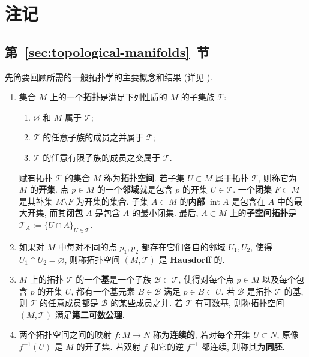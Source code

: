 \section{注记}\label{sec:notes-differentiable-manifolds}

\subsection[第 \ref{sec:topological-manifolds} 节]{第~\ref{sec:topological-manifolds}~节}\label{subsec:notes-topological-manifolds}

先简要回顾所需的一般拓扑学的主要概念和结果 (详见 ).

\begin{enumerate}[label=(\arabic*),leftmargin=*]
\item 集合 $M$ 上的一个\textbf{拓扑}是满足下列性质的 $M$ 的子集族 $\mathcal{T}$:
\begin{enumerate}[label=(\roman*),leftmargin=*]
\item $\varnothing$ 和 $M$ 属于 $\mathcal{T}$;
\item $\mathcal{T}$ 的任意子族的成员之并属于 $\mathcal{T}$;
\item $\mathcal{T}$ 的任意有限子族的成员之交属于 $\mathcal{T}$.
\end{enumerate}
赋有拓扑 $\mathcal{T}$ 的集合 $M$ 称为\textbf{拓扑空间}. 若子集 $U\subset M$ 属于拓扑 $\mathcal{T}$, 则称它为 $M$ 的\textbf{开集}. 点 $p\in M$ 的一个\textbf{邻域}就是包含 $p$ 的开集 $U\in\mathcal{T}$. 一个\textbf{闭集} $F\subset M$ 是其补集 $M\setminus F$ 为开集的集合. 子集 $A\subset M$ 的\textbf{内部} $\operatorname{int}A$ 是包含在 $A$ 中的最大开集, 而其\textbf{闭包} $\overline{A}$ 是包含 $A$ 的最小闭集. 最后, $A\subset M$ 上的\textbf{子空间拓扑}是 $\mathcal{T}_A:=\{U\cap A\}_{U\in\mathcal{T}}$.
\item 如果对 $M$ 中每对不同的点 $p_1,p_2$ 都存在它们各自的邻域 $U_1,U_2$, 使得 $U_1\cap U_2=\varnothing$, 则称拓扑空间 $(M,\mathcal{T})$ 是 \textbf{Hausdorff} 的.
\item $M$ 上的拓扑 $\mathcal{T}$ 的一个\textbf{基}是一个子族 $\mathcal{B}\subset\mathcal{T}$, 使得对每个点 $p\in M$ 以及每个包含 $p$ 的开集 $U$, 都有一个基元素 $B\in\mathcal{B}$ 满足 $p\in B\subset U$. 若 $\mathcal{B}$ 是拓扑 $\mathcal{T}$ 的基, 则 $\mathcal{T}$ 的任意成员都是 $\mathcal{B}$ 的某些成员之并. 若 $\mathcal{T}$ 有可数基, 则称拓扑空间 $(M,\mathcal{T})$ 满足\textbf{第二可数公理}.
\item 两个拓扑空间之间的映射 $f:M\to N$ 称为\textbf{连续的}, 若对每个开集 $U\subset N$, 原像 $f^{-1}(U)$ 是 $M$ 的开子集. 若双射 $f$ 和它的逆 $f^{-1}$ 都连续, 则称其为\textbf{同胚}.

\end{enumerate}
